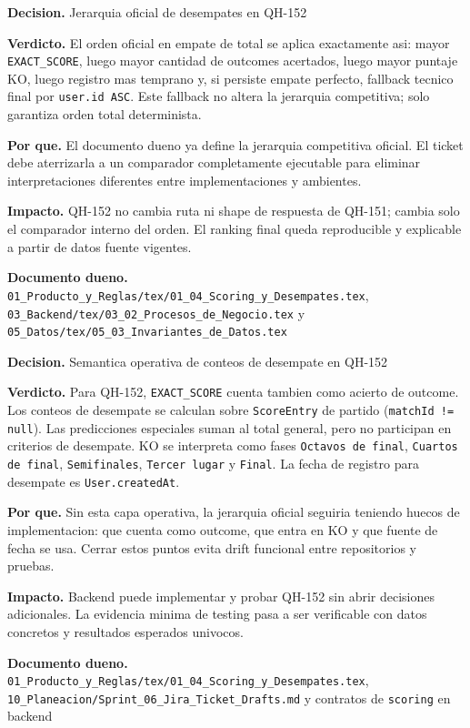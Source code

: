\begin{docnote}
\textbf{Decision.} Jerarquia oficial de desempates en QH-152

\textbf{Verdicto.} El orden oficial en empate de total se aplica exactamente asi: mayor \texttt{EXACT\_SCORE}, luego mayor cantidad de outcomes acertados, luego mayor puntaje KO, luego registro mas temprano y, si persiste empate perfecto, fallback tecnico final por \texttt{user.id ASC}. Este fallback no altera la jerarquia competitiva; solo garantiza orden total determinista.

\textbf{Por que.} El documento dueno ya define la jerarquia competitiva oficial. El ticket debe aterrizarla a un comparador completamente ejecutable para eliminar interpretaciones diferentes entre implementaciones y ambientes.

\textbf{Impacto.} QH-152 no cambia ruta ni shape de respuesta de QH-151; cambia solo el comparador interno del orden. El ranking final queda reproducible y explicable a partir de datos fuente vigentes.

\textbf{Documento dueno.} \texttt{01\_Producto\_y\_Reglas/tex/01\_04\_Scoring\_y\_Desempates.tex}, \texttt{03\_Backend/tex/03\_02\_Procesos\_de\_Negocio.tex} y \texttt{05\_Datos/tex/05\_03\_Invariantes\_de\_Datos.tex}
\end{docnote}

\begin{docnote}
\textbf{Decision.} Semantica operativa de conteos de desempate en QH-152

\textbf{Verdicto.} Para QH-152, \texttt{EXACT\_SCORE} cuenta tambien como acierto de outcome. Los conteos de desempate se calculan sobre \texttt{ScoreEntry} de partido (\texttt{matchId != null}). Las predicciones especiales suman al total general, pero no participan en criterios de desempate. KO se interpreta como fases \texttt{Octavos de final}, \texttt{Cuartos de final}, \texttt{Semifinales}, \texttt{Tercer lugar} y \texttt{Final}. La fecha de registro para desempate es \texttt{User.createdAt}.

\textbf{Por que.} Sin esta capa operativa, la jerarquia oficial seguiria teniendo huecos de implementacion: que cuenta como outcome, que entra en KO y que fuente de fecha se usa. Cerrar estos puntos evita drift funcional entre repositorios y pruebas.

\textbf{Impacto.} Backend puede implementar y probar QH-152 sin abrir decisiones adicionales. La evidencia minima de testing pasa a ser verificable con datos concretos y resultados esperados univocos.

\textbf{Documento dueno.} \texttt{01\_Producto\_y\_Reglas/tex/01\_04\_Scoring\_y\_Desempates.tex}, \texttt{10\_Planeacion/Sprint\_06\_Jira\_Ticket\_Drafts.md} y contratos de \texttt{scoring} en backend
\end{docnote}


